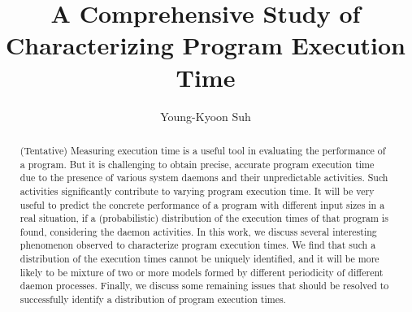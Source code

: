 \documentclass[10pt]{article}
\begin{document}
\title{A Comprehensive Study of Characterizing Program Execution Time}

\author{
Young-Kyoon Suh\\
}
\maketitle

\begin{abstract}
(Tentative) Measuring execution time is a useful tool in evaluating the performance of a program. 
But it is challenging to obtain precise, accurate program execution time due to the presence of various system daemons 
and their unpredictable activities. Such activities significantly contribute to varying program execution time.
It will be very useful to predict the concrete performance of a program with different input sizes in a real situation, 
if a (probabilistic) distribution of the execution times of that program is found, considering the daemon activities.
In this work, we discuss several interesting phenomenon observed to characterize program execution times.
We find that such a distribution of the execution times cannot be uniquely identified, and it will 
be more likely to be mixture of two or more models formed by different periodicity of different daemon processes. 
Finally, we discuss some remaining issues that should be resolved to successfully 
identify a distribution of program execution times. 
\end{abstract}
\end{document}
